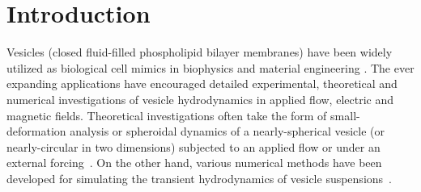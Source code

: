 \documentclass[prf,superscriptaddress,showpacs]{revtex4-1}
\begin{document}
\maketitle



\section{Introduction}
Vesicles (closed fluid-filled phospholipid bilayer membranes) have been
widely utilized as biological cell mimics in biophysics and material
engineering \cite{}.  The ever expanding applications have encouraged
detailed experimental, theoretical and numerical investigations of
vesicle hydrodynamics in applied flow, electric and magnetic fields.
Theoretical investigations often take the form of small-deformation
analysis or spheroidal dynamics of a nearly-spherical vesicle (or
nearly-circular in two dimensions) subjected to an applied flow or under
an external forcing~\cite{Barthes-BieselRallison1981_JFM,
Misbah2006_PRL, Vlahovska2007_PRE, Finken2008_EPL,
ZhangZahnTanLin2013_PoF, Nganguia2013_PRE}.  On the other hand, various
numerical methods have been developed for simulating the transient
hydrodynamics of vesicle suspensions~\cite{BagchiJohoson2005_JBE,
Biben2005_EJP, Veerapaneni2009_JCP, SeolHuKimLai2016_JCP}.  
\end{document}
